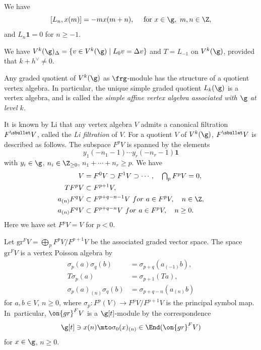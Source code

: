 \begin{lem}
\label{lem:sugawara-vs-g}
We have
\[
[L_n,x(m)]= - m x(m+n), \quad
\text{ for }x\in \g,\ m,n\in \Z,
\]
and $L_n\mathbf{1}=0$ for $n\geq -1$.
\end{lem}
We have
$V^k(\g) _{\Delta}=\{v\in V^k(\g)\mid L_0 v=\Delta v\}$
and $T=L_{-1}$ on $V^k(\g)$, provided that $k+h^{\vee}\ne 0$.

Any
graded quotient of $V^k(\g)$
as $\frg$-module
has the structure of a quotient vertex algebra.
In particular,
the unique simple graded quotient $L_k(\g)$
is a vertex algebra,
and is called the \emph{simple affine vertex algebra associated with $\g$ at level $k$.}

It is known by Li \cite{Li05}
that any vertex algebra $V$ admits a canonical filtration $F^\sbullet V$,
called the \emph{Li filtration} of $V$.
For a quotient $V$ of $V^k(\g)$,
$F^\sbullet V$ is described as follows.
The subspace
$F^p V$ is spanned by the elements
\[
y_{1}(-n_1-1)\cdots y_{r}(-n_r-1)\mathbf{1}
\]
with $y_{i} \in \g$,
$n_i\in\Z_{\geq 0}$, $ n_1+\cdots +n_r\geq p$.
We have
\begin{equation}
\label{eq:translation}
\begin{aligned}
V&=F^0V\supset F^1V\supset\cdots, \quad \textstyle\bigcap_{p}F^pV=0,\\ 
TF^pV&\subset F^{p+1}V,\\
a_{(n)}F^{q}V&\subset F^{p+q-n-1}V \ for \ a\in F^{p}V, \quad n\in\Z,\\
a_{(n)}F^{q}V&\subset F^{p+q-n}V \ for \ a\in F^{p}V, \quad n\geq 0.
\end{aligned}
\end{equation}
Here we have set $F^pV=V$ for $p<0$.

Let $\mathrm{gr}^FV=\bigoplus_p F^pV/F^{p+1}V$ be the associated graded vector space.
The space $\mathrm{gr}^FV$ is a vertex Poisson algebra by
\begin{align*}
\sigma_{p}(a)\sigma_{q}(b)&=\sigma_{p+q}(a_{(-1)}b),\\
T\sigma_{p}(a)&=\sigma_{p+1}(Ta),\\
\sigma_{p}(a)_{(n)}\sigma_{q}(b)&=\sigma_{p+q- n}(a_{(n)}b)
\end{align*}
for $a,b\in V$,
$n\geq 0$,
where $\sigma_p \colon F^p(V)\to F^pV/F^{p+1}V$ is the principal symbol map.
In~particular,
$\on{gr}^F V$ is a $\g[t]$-module by the correspondence
\begin{equation}
\g[t]\ni x(n)\mto \sigma_0(x)_{(n)}\in \End(\on{gr}^F V)
\label{eq:g[t]-action-in-gr}
\end{equation}
for $x\in \g$, $n\geq 0$.

